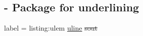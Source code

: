 
\subsection{ - Package for underlining}

\begin{tcblisting}{label = listing:ulem}
  \uline{uline}
  \sout{sout}
\end{tcblisting}
